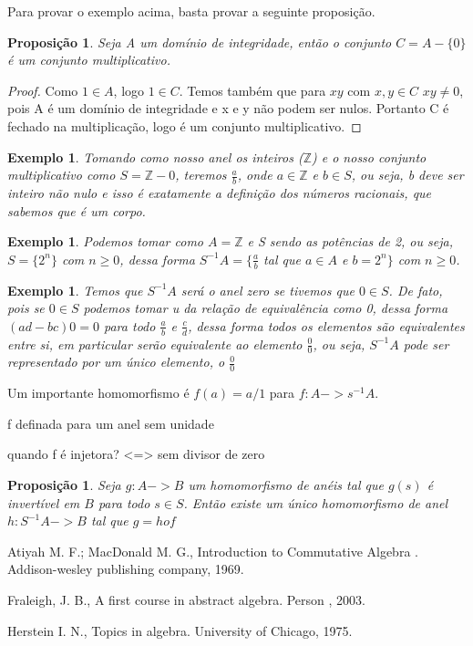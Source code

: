 \documentclass[10pt,a4paper]{article}
\newtheorem{proposition}[theorem]{Proposição}
\newtheorem{example}[theorem]{Exemplo}
\begin{document}
Para provar o exemplo acima, basta provar a seguinte proposição.

\begin{proposition}
	Seja A um domínio de integridade, então o conjunto $C = A - \{0\}$ é um conjunto multiplicativo.
\end{proposition}

\begin{proof}
	Como $1 \in A$, logo $1 \in C$. Temos também que para $xy$ com $x,y \in C$ $xy \neq 0$, pois A é um domínio de integridade e x e y não podem ser nulos. Portanto C é fechado na multiplicação, logo é um conjunto multiplicativo.
\end{proof}

\begin{example}
	Tomando como nosso anel os inteiros ($\mathbb{Z}$) e o nosso conjunto multiplicativo como $S=\mathbb{Z} - {0}$, teremos $\frac{a}{b}$, onde  $a \in \mathbb{Z}$ e $b \in S$, ou seja, b deve ser inteiro não nulo e isso é exatamente a definição dos números racionais, que sabemos que é um corpo.
\end{example}

\begin{example}
	Podemos tomar como $A=\mathbb{Z}$ e S sendo as potências de 2, ou seja, $S=\{2^n\}$ com $n \geq 0$, dessa forma $S^{-1}A=\{\frac{a}{b}$ tal que $ a \in A$ e $b=2^n \}$ com $n \geq 0$.
\end{example}

\begin{example}
	Temos que $S^{-1}A$ será o anel zero se tivemos que $0 \in S$. De fato, pois se $0 \in S$ podemos tomar u da relação de equivalência como 0, dessa forma $(ad-bc)0=0$ para todo $\frac{a}{b}$ e $\frac{c}{d}$, dessa forma todos os elementos são equivalentes entre si, em particular serão equivalente ao elemento $\frac{0}{0}$, ou seja, $S^{-1}A$ pode ser representado por um único elemento, o $\frac{0}{0}$
\end{example}

Um importante homomorfismo é $f(a)=a/1$ para $f:A->s^{-1}A$.

f definada para um anel sem unidade

quando f é injetora? <=> sem divisor de zero

\begin{proposition} Seja $g:A -> B$ um homomorfismo de anéis tal que $g(s)$ é invertível em $B$ para todo $s \in S$. Então existe um único homomorfismo de anel $h:S^{-1}A ->B$ tal que $g = hof$
\end{proposition}




\newpage

\begin{thebibliography}{20}
	
	  Atiyah M. F.; MacDonald M. G., Introduction to Commutative Algebra . Addison-wesley publishing company, 1969.
	
	  Fraleigh, J. B., A first course in abstract algebra. Person , 2003.
	
	 Herstein I. N., Topics in algebra. University of Chicago, 1975.	
	
\end{thebibliography}
\end{document}
